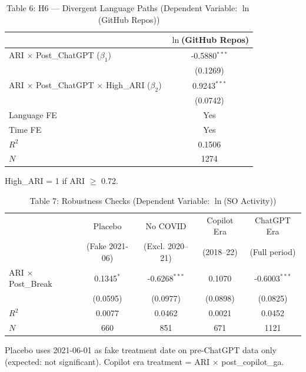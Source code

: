 \documentclass[12pt]{article}
\begin{document}
\begin{table}[htbp]
\centering
\caption{Table 6: H6 --- Divergent Language Paths (Dependent Variable: $\ln$(GitHub Repos))}
\begin{tabular}{lc}
\toprule
 & $\ln$(GitHub Repos) \\
\midrule
ARI $\times$ Post\_ChatGPT ($\beta_1$) & -0.5880$^{***}$ \\
 & (0.1269) \\
ARI $\times$ Post\_ChatGPT $\times$ High\_ARI ($\beta_2$) & 0.9243$^{***}$ \\
 & (0.0742) \\
\midrule
Language FE & Yes \\
Time FE & Yes \\
$R^2$ & 0.1506 \\
$N$ & 1274 \\
\bottomrule
\end{tabular}
\par\smallskip
{\footnotesize High\_ARI = 1 if ARI $\geq$ 0.72.}
\end{table}

\begin{table}[htbp]
\centering
\caption{Table 7: Robustness Checks (Dependent Variable: $\ln$(SO Activity))}
\begin{tabular}{lcccc}
\toprule
 & Placebo & No COVID & Copilot Era & ChatGPT Era \\
 & (Fake 2021-06) & (Excl. 2020--21) & (2018--22) & (Full period) \\
\midrule
ARI $\times$ Post\_Break & 0.1345$^{*}$ & -0.6268$^{***}$ & 0.1070 & -0.6003$^{***}$ \\
 & (0.0595) & (0.0977) & (0.0898) & (0.0825) \\
\midrule
$R^2$ & 0.0077 & 0.0462 & 0.0021 & 0.0452 \\
$N$ & 660 & 851 & 671 & 1121 \\
\bottomrule
\end{tabular}
\par\smallskip
{\footnotesize Placebo uses 2021-06-01 as fake treatment date on pre-ChatGPT data only (expected: not significant). Copilot era treatment = ARI $\times$ post\_copilot\_ga.}
\end{table}
\end{document}
